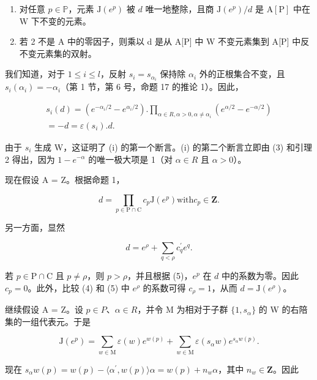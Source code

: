 \begin{enumerate}
\def\labelenumi{(\roman{enumi})}
\setcounter{enumi}{1}
\item
  对任意 \(p \in \mathbb{P}\)，元素 \(\mathrm{J}(e^p)\) 被 \(d\) 唯一地整除，且商 \(\mathrm{J}(e^p)/d\) 是 \(\mathrm{A}[\mathrm{P}]\) 中在 \(\mathrm{W}\) 下不变的元素。
\item
  若 2 不是 A 中的零因子，则乘以 d 是从 A{[}P{]} 中 W 不变元素集到 A{[}P{]} 中反不变元素集的双射。
\end{enumerate}

我们知道，对于 \(1 \leqslant i \leqslant l\)，反射 \(s_i = s_{\alpha_i}\) 保持除 \(\alpha_i\) 外的正根集合不变，且 \(s_i(\alpha_i) = -\alpha_i\)（第 1 节，第 6 号，命题 17 的推论 1）。因此，

\[
\begin{array}{l} s _ {i} (d) = (e ^ {- \alpha_ {i} / 2} - e ^ {\alpha_ {i} / 2}). \prod_ {\alpha \in R, \alpha > 0, \alpha \neq \alpha_ {i}} (e ^ {\alpha / 2} - e ^ {- \alpha / 2}) \\ = - d = \varepsilon (s _ {i}). d. \end{array}
\]

由于 \(s_{i}\) 生成 W，这证明了 (i) 的第一个断言。(i) 的第二个断言立即由 (3) 和引理 2 得出，因为 \(1 - e^{-\alpha}\) 的唯一极大项是 1（对 \(\alpha \in R\) 且 \(\alpha > 0\)）。

现在假设 A = Z。根据命题 1，

\[
d = \prod_ {p \in \mathrm{P} \cap \mathrm{C}} c _ {p} \mathrm{J} (e ^ {p}) \text {with} c _ {p} \in \mathbf {Z}.\tag{4}
\]

另一方面，显然

\[
d = e ^ {\rho} + \sum_ {q <   \rho} c _ {q} ^ {\prime} e ^ {q}.\tag{5}
\]

若 \(p \in \mathrm{P} \cap \mathrm{C}\) 且 \(p \neq \rho\)，则 \(p > \rho\)，并且根据 (5)，\(e^p\) 在 \(d\) 中的系数为零。因此 \(c_p = 0\)。此外，比较 (4) 和 (5) 中 \(e^\rho\) 的系数可得 \(c_\rho = 1\)，从而 \(d = \mathrm{J}(e^\rho)\)。

继续假设 A = Z。设 \(p \in P\)、\(\alpha \in R\)，并令 M 为相对于子群 \(\{1, s_{\alpha}\}\) 的 W 的右陪集的一组代表元。于是

\[
\mathrm{J} (e ^ {p}) = \sum_ {w \in \mathrm{M}} \varepsilon (w) e ^ {w (p)} + \sum_ {w \in \mathrm{M}} \varepsilon (s _ {\alpha} w) e ^ {s _ {\alpha} w (p)}.
\]

现在 \(s_{\alpha}w(p) = w(p) - \langle \alpha^{\prime},w(p)\rangle \alpha = w(p) + n_w\alpha\)，其中 \(n_w\in \mathbf{Z}\)。因此

